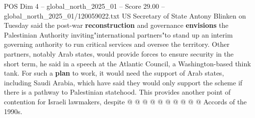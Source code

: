 \begin{textsample}{POS Dim 4 – global\_north\_2025\_01 – Score 29.00 – global\_north\_2025\_01/120059022.txt}
US Secretary of State Antony Blinken on Tuesday said the post-war \textbf{reconstruction} and governance \textbf{envisions} the Palestinian Authority inviting"international partners"to stand up an interim governing authority to run critical services and oversee the territory.
Other partners, notably Arab states, would provide forces to ensure security in the short term, he said in a speech at the Atlantic Council, a Washington-based think tank.
For such a \textbf{plan} to work, it would need the support of Arab states, including Saudi Arabia, which have said they would only support the scheme if there is a pathway to Palestinian statehood.
This provides another point of contention for Israeli lawmakers, despite @ @ @ @ @ @ @ @ @ @ Accords of the 1990s.

\end{textsample}
